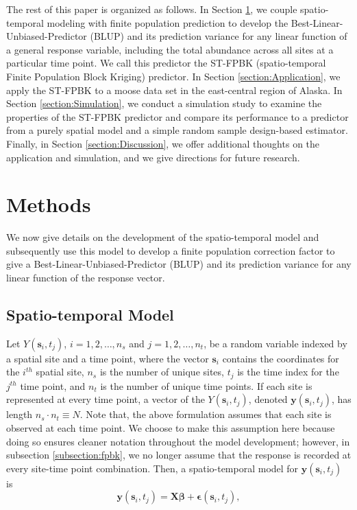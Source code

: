 \documentclass[smallextended]{svjour3}       %
\begin{document}
The rest of this paper is organized as follows. In Section
\ref{section:Methods}, we couple spatio-temporal modeling with finite
population prediction to develop the Best-Linear-Unbiased-Predictor
(BLUP) and its prediction variance for any linear function of a general
response variable, including the total abundance across all sites at a
particular time point. We call this predictor the ST-FPBK
(spatio-temporal Finite Population Block Kriging) predictor. In Section
\ref{section:Application}, we apply the ST-FPBK to a moose data set in
the east-central region of Alaska. In Section \ref{section:Simulation},
we conduct a simulation study to examine the properties of the ST-FPBK
predictor and compare its performance to a predictor from a purely
spatial model and a simple random sample design-based estimator.
Finally, in Section \ref{section:Discussion}, we offer additional
thoughts on the application and simulation, and we give directions for
future research.

\hypertarget{section:Methods}{%
\section{Methods}\label{section:Methods}}

We now give details on the development of the spatio-temporal model and
subsequently use this model to develop a finite population correction
factor to give a Best-Linear-Unbiased-Predictor (BLUP) and its
prediction variance for any linear function of the response vector.

\hypertarget{spatio-temporal-model}{%
\subsection{Spatio-temporal Model}\label{spatio-temporal-model}}

Let \(Y(\mathbf{s}_{i}, t_j)\), \(i = 1, 2, \ldots, n_{s}\) and
\(j = 1, 2, \ldots, n_{t}\), be a random variable indexed by a spatial
site and a time point, where the vector \(\mathbf{s}_i\) contains the
coordinates for the \(i^{th}\) spatial site, \(n_s\) is the number of
unique sites, \(t_j\) is the time index for the \(j^{th}\) time point,
and \(n_t\) is the number of unique time points. If each site is
represented at every time point, a vector of the
\(Y(\mathbf{s}_{i}, t_j)\), denoted \(\mathbf{y}(\mathbf{s}_{i}, t_j)\),
has length \(n_{s} \cdot n_{t} \equiv N\). Note that, the above
formulation assumes that each site is observed at each time point. We
choose to make this assumption here because doing so ensures cleaner
notation throughout the model development; however, in subsection
\ref{subsection:fpbk}, we no longer assume that the response is recorded
at every site-time point combination. Then, a spatio-temporal model for
\(\mathbf{y}(\mathbf{s}_{i}, t_j)\) is \mbox{} \begin{equation}
\mathbf{y}(\mathbf{s}_{i}, t_j) = \mathbf{X} \bm{\beta} + \bm{\epsilon}(\mathbf{s}_{i}, t_j),
\end{equation}
\end{document}
